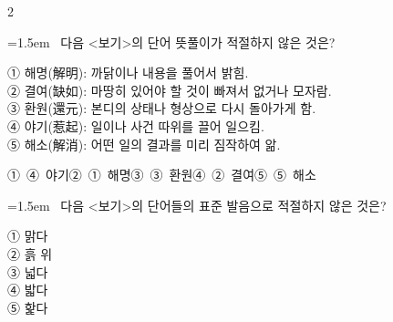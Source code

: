 \documentclass[10pt, a4paper]{article}
\begin{document}
\begin{multicols}{2}
\noindent\begin{minipage}{\columnwidth}
\vspace{2mm}
{\hangindent=1.5em  ~다음 <보기>의 단어 뜻풀이가 적절하지 않은 것은?\par}

\vspace{1mm}
\begin{boxibox}
① 해명(解明): 까닭이나 내용을 풀어서 밝힘. \\
② 결여(缺如): 마땅히 있어야 할 것이 빠져서 없거나 모자람. \\
③ 환원(還元): 본디의 상태나 형상으로 다시 돌아가게 함. \\
④ 야기(惹起): 일이나 사건 따위를 끌어 일으킴. \\
⑤ 해소(解消): 어떤 일의 결과를 미리 짐작하여 앎. \\
\end{boxibox}
\vspace{1mm}

\vspace{0.5mm}
\noindent
\mbox{①~④ 야기}\hspace{1em}\mbox{②~① 해명}\hspace{1em}\mbox{③~③ 환원}\hspace{1em}\mbox{④~② 결여}\hspace{1em}\mbox{⑤~⑤ 해소}

\vspace{4mm}
\end{minipage}
\par

\noindent\begin{minipage}{\columnwidth}
\vspace{2mm}
{\hangindent=1.5em  ~다음 <보기>의 단어들의 표준 발음으로 적절하지 않은 것은?\par}

\vspace{1mm}
\begin{boxibox}
① 맑다 \\
② 흙 위 \\
③ 넓다 \\
④ 밟다 \\
⑤ 핥다 \\
\end{boxibox}
\vspace{1mm}


\end{minipage}
\end{multicols}
\end{document}
